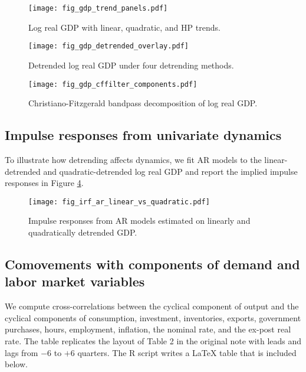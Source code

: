 \documentclass[11pt]{article}
\begin{document}
\begin{figure}[h]
\centering
\texttt{[image: fig\_gdp\_trend\_panels.pdf]}
\caption{Log real GDP with linear, quadratic, and HP trends.}
\label{fig:gdp-trend}
\end{figure}

\begin{figure}[h]
\centering
\texttt{[image: fig\_gdp\_detrended\_overlay.pdf]}
\caption{Detrended log real GDP under four detrending methods.}
\label{fig:gdp-detrended}
\end{figure}

\begin{figure}[h]
\centering
\texttt{[image: fig\_gdp\_cffilter\_components.pdf]}
\caption{Christiano-Fitzgerald bandpass decomposition of log real GDP.}
\label{fig:gdp-cf}
\end{figure}

\subsection{Impulse responses from univariate dynamics}

To illustrate how detrending affects dynamics, we fit AR models to the linear-detrended and quadratic-detrended log real GDP and report the implied impulse responses in Figure \ref{fig:irf-ar}.

\begin{figure}[h]
\centering
\texttt{[image: fig\_irf\_ar\_linear\_vs\_quadratic.pdf]}
\caption{Impulse responses from AR models estimated on linearly and quadratically detrended GDP.}
\label{fig:irf-ar}
\end{figure}

\subsection{Comovements with components of demand and labor market variables}

We compute cross-correlations between the cyclical component of output and the cyclical components of consumption, investment, inventories, exports, government purchases, hours, employment, inflation, the nominal rate, and the ex-post real rate. The table replicates the layout of Table 2 in the original note with leads and lags from $-6$ to $+6$ quarters. The R script writes a LaTeX table that is included below.

\begin{landscape}

\end{landscape}
\end{document}
